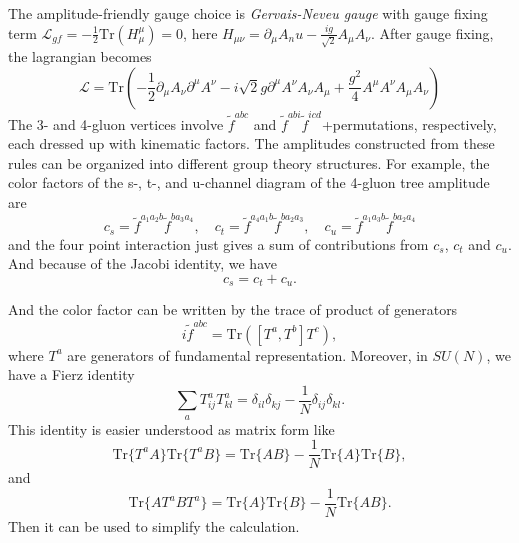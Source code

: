 \documentclass[12pt]{article}
\numberwithin{equation}{section}
\begin{document}
The amplitude-friendly gauge choice is \textit{Gervais-Neveu gauge } with gauge fixing term $\mathcal{L}_{gf}=-\frac{1}{2}\mathrm{Tr}(H_\mu^\mu)=0$, here $H_{\mu\nu}=\partial_\mu A_nu - \frac{ig}{\sqrt{2}}A_\mu A_\nu$.
After gauge fixing, the lagrangian becomes 
\begin{equation}
    \mathcal{L}=\mathrm{Tr} \left(-\frac{1}{2}\partial_\mu A_\nu \partial^\mu A^\nu - i\sqrt{2}g\partial^\mu A^\nu A_\nu A_\mu+\frac{g^2}{4}A^\mu A^\nu A_\mu A_\nu \right)
\end{equation}
The 3- and 4-gluon vertices involve $\tilde{f}^{abc}$ and $\tilde{f}^{abi}\tilde{f}^{icd}$+permutations, respectively, each dressed up with kinematic factors.
The amplitudes constructed from these rules can be organized into
different group theory structures. For example, the
color factors of the s-, t-, and u-channel diagram of the 4-gluon tree amplitude are
\begin{equation}
    c_s=\tilde{f}^{a_1a_2b}\tilde{f}^{ba_3a_4},\quad c_t=\tilde{f}^{a_4a_1b}\tilde{f}^{ba_2a_3},\quad c_u=\tilde{f}^{a_1a_3b}\tilde{f}^{ba_2a_4}
\end{equation}
and the four point interaction just gives a sum of contributions from $c_s$, $c_t$ and $c_u$. And because of the Jacobi identity, we have
\begin{equation}
    c_s=c_t+c_u.
\end{equation}

And the color factor can be written by the trace of product of generators
\begin{equation}
    i\tilde{f}^{abc}=\mathrm{Tr}([T^a,T^b]T^c),
\end{equation}
where $T^a$ are generators of fundamental representation. Moreover, in $SU(N)$, we have a Fierz identity
\begin{equation}
    \sum_{a}T^a_{ij}T^a_{kl}=\delta_{il}\delta_{kj}-\frac{1}{N}\delta_{ij}\delta_{kl}.
\end{equation}
This identity is easier understood as matrix form like 
\begin{equation}
    \mathrm{Tr}\{T^aA\}\mathrm{Tr}\{T^aB\}=\mathrm{Tr}\{AB\}-\frac{1}{N}\mathrm{Tr}\{A\}\mathrm{Tr}\{B\},
\end{equation}
and
\begin{equation}
    \mathrm{Tr}\{AT^aBT^a\}=\mathrm{Tr}\{A\}\mathrm{Tr}\{B\}-\frac{1}{N}\mathrm{Tr}\{AB\}.
\end{equation}
Then it can be used to simplify the calculation.
\end{document}

